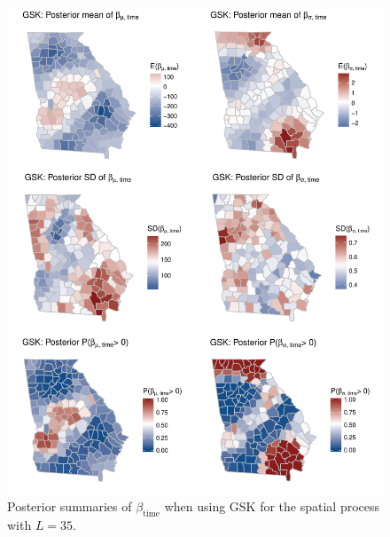 \documentclass[11pt]{article}
\begin{document}
\begin{figure}  %
  \centering
  \includegraphics[width=\linewidth]{plots/gsk-post-betatime.pdf}
  \caption{Posterior summaries of $\beta_{\text{time}}$ when using GSK for the spatial process with $L = 35$.}
  \label{ebfig:gskpost}
\end{figure}


\end{document}
